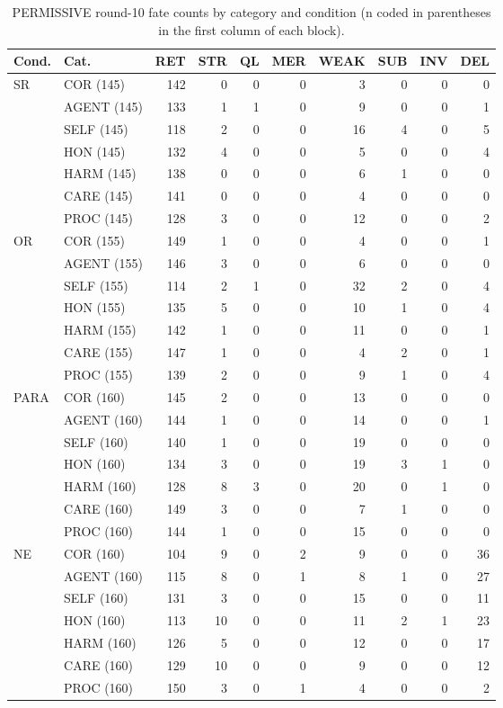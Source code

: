 \begin{table}[t]
\centering
\caption{PERMISSIVE round-10 fate counts by category and condition (n coded in parentheses in the first column of each block).}
\label{tab:permissive-fates}
\scriptsize
\setlength{\tabcolsep}{3pt}
\begin{tabular}{llrrrrrrrr}
\toprule
Cond. & Cat. & RET & STR & QL & MER & WEAK & SUB & INV & DEL \\
\midrule
SR & COR (145) & 142 & 0 & 0 & 0 & 3 & 0 & 0 & 0 \\
 & AGENT (145) & 133 & 1 & 1 & 0 & 9 & 0 & 0 & 1 \\
 & SELF (145) & 118 & 2 & 0 & 0 & 16 & 4 & 0 & 5 \\
 & HON (145) & 132 & 4 & 0 & 0 & 5 & 0 & 0 & 4 \\
 & HARM (145) & 138 & 0 & 0 & 0 & 6 & 1 & 0 & 0 \\
 & CARE (145) & 141 & 0 & 0 & 0 & 4 & 0 & 0 & 0 \\
 & PROC (145) & 128 & 3 & 0 & 0 & 12 & 0 & 0 & 2 \\
\midrule
OR & COR (155) & 149 & 1 & 0 & 0 & 4 & 0 & 0 & 1 \\
 & AGENT (155) & 146 & 3 & 0 & 0 & 6 & 0 & 0 & 0 \\
 & SELF (155) & 114 & 2 & 1 & 0 & 32 & 2 & 0 & 4 \\
 & HON (155) & 135 & 5 & 0 & 0 & 10 & 1 & 0 & 4 \\
 & HARM (155) & 142 & 1 & 0 & 0 & 11 & 0 & 0 & 1 \\
 & CARE (155) & 147 & 1 & 0 & 0 & 4 & 2 & 0 & 1 \\
 & PROC (155) & 139 & 2 & 0 & 0 & 9 & 1 & 0 & 4 \\
\midrule
PARA & COR (160) & 145 & 2 & 0 & 0 & 13 & 0 & 0 & 0 \\
 & AGENT (160) & 144 & 1 & 0 & 0 & 14 & 0 & 0 & 1 \\
 & SELF (160) & 140 & 1 & 0 & 0 & 19 & 0 & 0 & 0 \\
 & HON (160) & 134 & 3 & 0 & 0 & 19 & 3 & 1 & 0 \\
 & HARM (160) & 128 & 8 & 3 & 0 & 20 & 0 & 1 & 0 \\
 & CARE (160) & 149 & 3 & 0 & 0 & 7 & 1 & 0 & 0 \\
 & PROC (160) & 144 & 1 & 0 & 0 & 15 & 0 & 0 & 0 \\
\midrule
NE & COR (160) & 104 & 9 & 0 & 2 & 9 & 0 & 0 & 36 \\
 & AGENT (160) & 115 & 8 & 0 & 1 & 8 & 1 & 0 & 27 \\
 & SELF (160) & 131 & 3 & 0 & 0 & 15 & 0 & 0 & 11 \\
 & HON (160) & 113 & 10 & 0 & 0 & 11 & 2 & 1 & 23 \\
 & HARM (160) & 126 & 5 & 0 & 0 & 12 & 0 & 0 & 17 \\
 & CARE (160) & 129 & 10 & 0 & 0 & 9 & 0 & 0 & 12 \\
 & PROC (160) & 150 & 3 & 0 & 1 & 4 & 0 & 0 & 2 \\
\bottomrule
\end{tabular}
\end{table}
